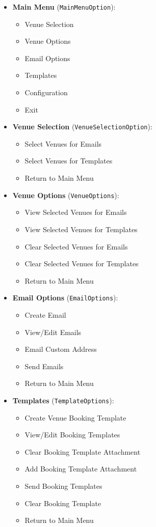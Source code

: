 \documentclass{article}
\begin{document}
	\begin{itemize}
		\item \textbf{Main Menu} (\texttt{MainMenuOption}):
		\begin{itemize}
			\item Venue Selection
			\item Venue Options
			\item Email Options
			\item Templates
			\item Configuration
			\item Exit
		\end{itemize}
		
		\item \textbf{Venue Selection} (\texttt{VenueSelectionOption}):
		\begin{itemize}
			\item Select Venues for Emails
			\item Select Venues for Templates
			\item Return to Main Menu
		\end{itemize}
		
		\item \textbf{Venue Options} (\texttt{VenueOptions}):
		\begin{itemize}
			\item View Selected Venues for Emails
			\item View Selected Venues for Templates
			\item Clear Selected Venues for Emails
			\item Clear Selected Venues for Templates
			\item Return to Main Menu
		\end{itemize}
		
		\item \textbf{Email Options} (\texttt{EmailOptions}):
		\begin{itemize}
			\item Create Email
			\item View/Edit Emails
			\item Email Custom Address
			\item Send Emails
			\item Return to Main Menu
		\end{itemize}
		
		\item \textbf{Templates} (\texttt{TemplateOptions}):
		\begin{itemize}
			\item Create Venue Booking Template
			\item View/Edit Booking Templates
			\item Clear Booking Template Attachment
			\item Add Booking Template Attachment
			\item Send Booking Templates
			\item Clear Booking Template
			\item Return to Main Menu
		\end{itemize}
		

\end{itemize}
\end{document}
